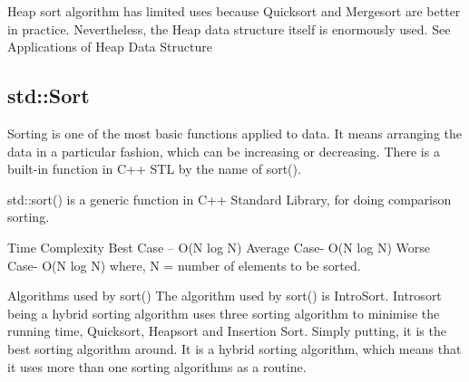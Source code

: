 \documentclass{article}
\begin{document}
Heap sort algorithm has limited uses because Quicksort and Mergesort are better in practice. Nevertheless, the Heap data structure itself is enormously used. See Applications of Heap Data Structure



\subsection{std::Sort}

Sorting is one of the most basic functions applied to data. It means arranging the data in a particular fashion, which can be increasing or decreasing. There is a built-in function in C++ STL by the name of sort().

std::sort() is a generic function in C++ Standard Library, for doing comparison sorting.


Time Complexity
Best Case – O(N log N)
Average Case- O(N log N)
Worse Case- O(N log N)
where, N = number of elements to be sorted.

Algorithms used by sort()
The algorithm used by sort() is IntroSort. Introsort being a hybrid sorting algorithm uses three sorting algorithm to minimise the running time, Quicksort, Heapsort and Insertion Sort. Simply putting, it is the best sorting algorithm around. It is a hybrid sorting algorithm, which means that it uses more than one sorting algorithms as a routine.
\end{document}
